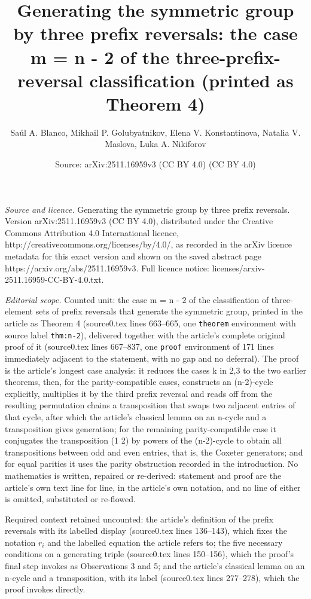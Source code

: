 \documentclass[10pt,a4paper]{amsart}
\title[Generating the symmetric group by three prefix reversals]{Generating the symmetric group by three prefix reversals: the case m = n - 2 of the three-prefix-reversal classification (printed as Theorem 4)}
\author{Sa\'ul A. Blanco, Mikhail P. Golubyatnikov, Elena V. Konstantinova, Natalia V. Maslova, Luka A. Nikiforov}
\date{Source: arXiv:2511.16959v3 (CC BY 4.0) (CC BY 4.0)}
\theoremstyle{plain}
\theoremstyle{definition}
\begin{document}
\maketitle

\noindent\emph{Source and licence.} Generating the symmetric group by three prefix reversals. Version arXiv:2511.16959v3 (CC BY 4.0), distributed under the Creative Commons Attribution 4.0 International licence, http://creativecommons.org/licenses/by/4.0/, as recorded in the arXiv licence metadata for this exact version and shown on the saved abstract page https://arxiv.org/abs/2511.16959v3. Full licence notice: licenses/arxiv-2511.16959-CC-BY-4.0.txt.\par\smallskip

\noindent\textit{Editorial scope.} Counted unit: the case m = n - 2 of the classification of three-element sets of prefix reversals that generate the symmetric group, printed in the article as Theorem 4 (source0.tex lines 663--665, one \texttt{theorem} environment with source label \texttt{thm:n-2}), delivered together with the article's complete original proof of it (source0.tex lines 667--837, one \texttt{proof} environment of 171 lines immediately adjacent to the statement, with no gap and no deferral). The proof is the article's longest case analysis: it reduces the cases k in {2,3} to the two earlier theorems, then, for the parity-compatible cases, constructs an (n-2)-cycle explicitly, multiplies it by the third prefix reversal and reads off from the resulting permutation chains a transposition that swaps two adjacent entries of that cycle, after which the article's classical lemma on an n-cycle and a transposition gives generation; for the remaining parity-compatible case it conjugates the transposition (1 2) by powers of the (n-2)-cycle to obtain all transpositions between odd and even entries, that is, the Coxeter generators; and for equal parities it uses the parity obstruction recorded in the introduction. No mathematics is written, repaired or re-derived: statement and proof are the article's own text line for line, in the article's own notation, and no line of either is omitted, substituted or re-flowed.

Required context retained uncounted: the article's definition of the prefix reversals with its labelled display (source0.tex lines 136--143), which fixes the notation $r_i$ and the labelled equation the article refers to; the five necessary conditions on a generating triple (source0.tex lines 150--156), which the proof's final step invokes as Observations 3 and 5; and the article's classical lemma on an n-cycle and a transposition, with its label (source0.tex lines 277--278), which the proof invokes directly.
\end{document}
